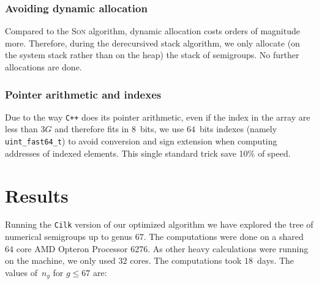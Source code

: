 \documentclass[reqno]{amsart}
\theoremstyle{plain}
\theoremstyle{definition}
\newcommand{\Cilk}{\texttt{Cilk}\xspace}
\newcommand{\CPP}{\texttt{C++}\xspace}
\renewcommand{\leq}{\leqslant}
\begin{document}
\vspace{1em}

\subsubsection*{Avoiding dynamic allocation} Compared to the \textsc{Son}
algorithm, dynamic allocation costs orders of magnitude more. Therefore, during
the derecursived stack algorithm, we only allocate (on the system stack rather
than on the heap) the stack of semigroups. No further allocations are done.

\subsubsection*{Pointer arithmetic and indexes}

Due to the way \CPP does its pointer arithmetic, even if the index in the
array are less than $3G$ and therefore fits in $8$~bits, we use $64$~bits
indexes (namely \verb|uint_fast64_t|) to avoid conversion and sign extension
when computing addresses of indexed elements. This single standard trick save
10\% of speed.


\section{Results}

Running the \Cilk version of our optimized algorithm we have explored the tree
of numerical semigroups up to genus $67$. The computations were done on a shared
$64$ core AMD Opteron\texttrademark{} Processor 6276. As other heavy
calculations were running on the machine, we only used $32$ cores. The
computations took $18$~days. The values of~$n_g$ for $g\leq 67$ are:
\end{document}
